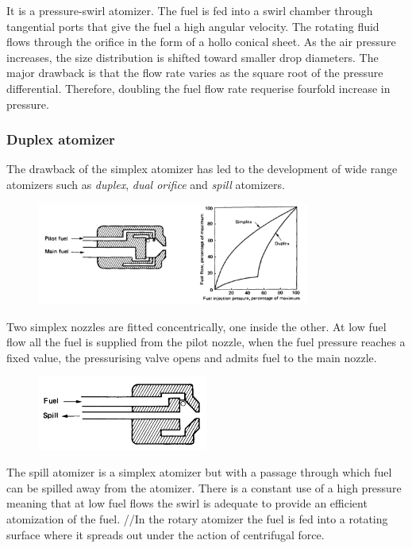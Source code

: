 \documentclass[12pt]{article}
\begin{document}
It is a pressure-swirl atomizer. The fuel is fed into a swirl chamber through tangential ports that give the fuel a high angular velocity. The rotating fluid flows through the orifice in the form of a hollo conical sheet. As the air pressure increases, the size distribution is shifted toward smaller drop diameters. The major drawback is that the flow rate varies as the square root of the pressure differential. Therefore, doubling the fuel flow rate requerise fourfold increase in pressure.

\subsubsection{Duplex atomizer}

The drawback of the simplex atomizer has led to the development of wide range atomizers such as \textit{duplex}, \textit{dual orifice} and \textit{spill} atomizers.\\

\begin{figure}[h!]
\centering
\includegraphics[width=0.8\textwidth]{figures/duplex.png}
\end{figure}

Two simplex nozzles are fitted concentrically, one inside the other. At low fuel flow all the fuel is supplied from the pilot nozzle, when the fuel pressure reaches a fixed value, the pressurising valve opens and admits fuel to the main nozzle.

\begin{figure}[h!]
\centering
\includegraphics[width=0.5\textwidth]{figures/spill.png}
\end{figure}

The spill atomizer is a simplex atomizer but with a passage through which fuel can be spilled away from the atomizer. There is a constant use of a high pressure meaning that at low fuel flows the swirl is adequate to provide an efficient atomization of the fuel.
//In the rotary atomizer the fuel is fed into a rotating surface where it spreads out under the action of centrifugal force.
\end{document}
